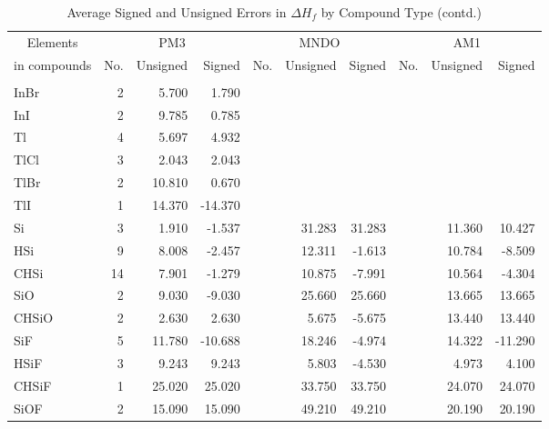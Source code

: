 \begin{table}
\caption{\label{avehofd}Average Signed and Unsigned Errors in $\Delta H_f$ by
 Compound Type (contd.)}
\compresstable
\begin{center}
\begin{tabular}{lrrrrrrrrr}
\multicolumn{1}{c}{Elements} & \multicolumn{3}{c}{PM3} & \multicolumn{3}{c}{MNDO} &
\multicolumn{3}{c}{AM1} \\
\multicolumn{1}{c}{in compounds} &  No. & Unsigned & Signed & No. & Unsigned & Signed & No. & Unsigned & Signed \\
\hline\\
  InBr      &   2 &    5.700 &    1.790 &     &          &          &     &          &          \\
  InI       &   2 &    9.785 &    0.785 &     &          &          &     &          &          \\
  Tl        &   4 &    5.697 &    4.932 &     &          &          &     &          &          \\
  TlCl      &   3 &    2.043 &    2.043 &     &          &          &     &          &          \\
  TlBr      &   2 &   10.810 &    0.670 &     &          &          &     &          &          \\
  TlI       &   1 &   14.370 &  -14.370 &     &          &          &     &          &          \\
      Si      &      3 &    1.910 &   -1.537 &  &   31.283 &   31.283 &  &   11.360 &   10.427 \\
      HSi     &      9 &    8.008 &   -2.457 &  &   12.311 &   -1.613 &  &   10.784 &   -8.509 \\
      CHSi    &     14 &    7.901 &   -1.279 &  &   10.875 &   -7.991 &  &   10.564 &   -4.304 \\
      SiO     &      2 &    9.030 &   -9.030 &  &   25.660 &   25.660 &  &   13.665 &   13.665 \\
      CHSiO   &      2 &    2.630 &    2.630 &  &    5.675 &   -5.675 &  &   13.440 &   13.440 \\
      SiF     &      5 &   11.780 &  -10.688 &  &   18.246 &   -4.974 &  &   14.322 &  -11.290 \\
      HSiF    &      3 &    9.243 &    9.243 &  &    5.803 &   -4.530 &  &    4.973 &    4.100 \\
      CHSiF   &      1 &   25.020 &   25.020 &  &   33.750 &   33.750 &  &   24.070 &   24.070 \\
      SiOF    &      2 &   15.090 &   15.090 &  &   49.210 &   49.210 &  &   20.190 &   20.190 \\

\end{tabular}
\end{center}
\end{table}
